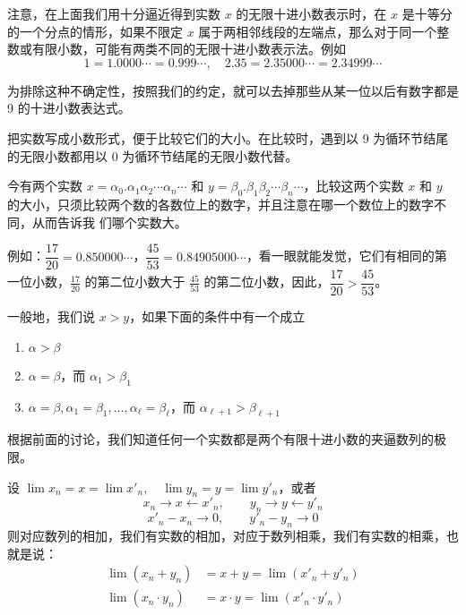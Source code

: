 注意，在上面我们用十分逼近得到实数 $x$ 的无限十进小数表示时，在 $x$ 是十等分的一个分点的情形，如果不限定 $x$ 属于两相邻线段的左端点，那么对于同一个整数或有限小数，可能有两类不同的无限十进小数表示法。例如
\[1=1.0000\cdots=0.999\cdots,\quad 2.35=2.35000\cdots=2.34999\cdots\]

为排除这种不确定性，按照我们的约定，就可以去掉那些从某一位以后有数字都是 9 的十进小数表达式。

把实数写成小数形式，便于比较它们的大小。在比较时，遇到以 9 为循环节结尾的无限小数都用以 0 为循环节结尾的无限小数代替。

今有两个实数 $x=\alpha_0.\alpha_1\alpha_2\cdots\alpha_n\cdots$ 和 $y=\beta_0.\beta_1\beta_2\cdots\beta_n\cdots$，比较这两个实数 $x$ 和 $y$ 的大小，只须比较两个数的各数位上的数字，并且注意在哪一个数位上的数字不同，从而告诉我
们哪个实数大。


{\linespread{1.6}\selectfont 例如：$\dfrac{17}{20}=0.850000\cdots$，$\dfrac{45}{53}=0.84905000\cdots$，看一眼就能发觉，它们有相同的第一位小数，$\frac{17}{20}$ 的第二位小数大于 $\frac{45}{53}$ 的第二位小数，因此，$\dfrac{17}{20}>\dfrac{45}{53}$。\par}

\medskip
一般地，我们说 $x>y$，如果下面的条件中有一个成立
\begin{enumerate}
  \item $\alpha>\beta$
  \item $\alpha=\beta$，而 $\alpha_1>\beta_1$
  \item $\alpha=\beta, \alpha_1 =\beta_1,\ldots,\alpha_{\ell}=\beta_{\ell}$，而 $\alpha_{\ell+1}>\beta_{\ell+1}$
\end{enumerate}

\bigskip
根据前面的讨论，我们知道任何一个实数都是两个有限十进小数的夹逼数列的极限。

设 $\lim x_n=x=\lim x'_n,\quad \lim y_n=y=\lim y'_n$，或者
\[x_n\to x\leftarrow x'_n,\qquad y_n\to y\leftarrow y'_n\]
\[x'_n-x_n\to 0,\qquad y'_n-y_n\to 0\]
则对应数列的相加，我们有实数的相加，对应于数列相乘，我们有实数的相乘，也就是说：
\[\begin{split}
  \lim(x_n+y_n)&=x+y=\lim(x'_n+y'_n)\\
  \lim(x_n\cdot y_n)&=x\cdot y=\lim(x'_n\cdot y'_n)
\end{split}
\]

